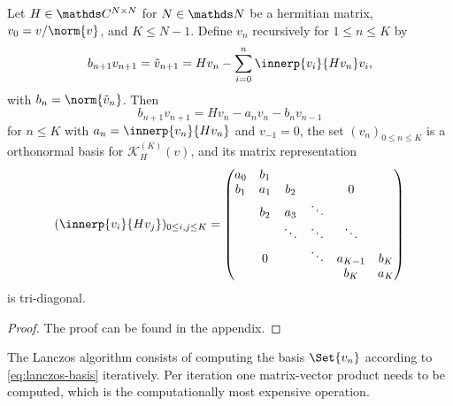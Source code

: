 \begin{lemma}\label{thm:lanczos-ONB}
    Let \(H\in \C^{N\times N}\) for \(N\in\N\) be a hermitian matrix, \(v_0 = v / \norm{v}\), and \(K \leq N-1\).
    Define \(v_n\) recursively for \(1 \leq n \leq K\) by
    \begin{equation}\label{eq:lanczos-basis-def}
        b_{n+1}v_{n+1} = \tilde v_{n+1} = H v_n - \sum_{i=0}^n \innerp{v_i}{H v_n} v_i
        ,
    \end{equation}
    with \(b_n = \norm{\tilde v_n}\).
    Then
    \begin{equation}\label{eq:lanczos-basis}
        b_{n+1} v_{n+1} = H v_n - a_n v_n - b_n v_{n-1}
    \end{equation}
    for \(n\leq K\) with \(a_n = \innerp{v_n}{H v_n}\) and \(v_{-1} = 0\),
    the set \((v_n)_{0\leq n \leq K}\) is a orthonormal basis for \(\mathcal{K}^{(K)}_H(v)\), and its matrix representation
    \begin{equation}\label{eq:lanczos-tri-diagonal}
        (\innerp{v_i}{H v_j})_{0 \leq i,j \leq K} = 
        \begin{pmatrix}
            a_0 & b_1 &        &        &         &    \\
            b_1 & a_1 & b_2    &        &   0     &    \\
                & b_2 & a_3    & \ddots &         &    \\
                &     & \ddots & \ddots & \ddots  &    \\
                & 0   &        & \ddots & a_{K-1} & b_K\\
                &     &        &        & b_K     & a_{K}
        \end{pmatrix}
    \end{equation}
    is tri-diagonal.
\end{lemma}
\begin{proof}
    The proof can be found in the appendix.
\end{proof}

The Lanczos algorithm consists of computing the basis \(\Set{v_n}\) according to \cref{eq:lanczos-basis} iteratively. 
Per iteration one matrix-vector product needs to be computed, which is the computationally most expensive operation.

